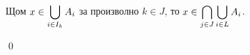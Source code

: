 \begin{problem}
\begin{tcolorbox}[mybox={Доказателство:}]
\quad
Щом $\displaystyle x \in \bigcup_{i \in I_k} A_i$ за произволно $k \in J$,
то $\displaystyle x \in \bigcap_{j \in J} \bigcup_{i \in L} A_i$.

\qed
\end{tcolorbox}

\end{problem}
